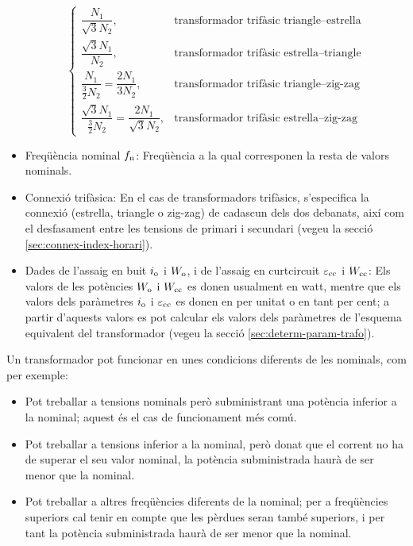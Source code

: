 \begin{itemize}
\begin{equation}
\begin{cases}
        \dfrac{N_1}{\sqrt{3}N_2}, & \text{transformador trifàsic triangle--estrella} \\[0.4cm]
        \dfrac{\sqrt{3}N_1}{N_2}, & \text{transformador trifàsic estrella--triangle} \\[0.4cm]
        \dfrac{N_1}{\frac{3}{2}N_2} = \dfrac{2 N_1}{3 N_2}, & \text{transformador trifàsic triangle--zig-zag} \\[0.4cm]
        \dfrac{\sqrt{3}N_1}{\frac{3}{2}N_2} = \dfrac{2 N_1}{\sqrt{3} N_2}, & \text{transformador trifàsic estrella--zig-zag}
         \end{cases}
       \end{equation}
   \item Freqüència nominal $f_\mathrm{n}$: Freqüència a la qual corresponen la resta de valors nominals.
   \item Connexió trifàsica: En el cas de transformadors trifàsics, s'especifica la connexió (estrella, triangle o zig-zag) de cadascun dels dos debanats, així com el desfasament entre les tensions de primari i secundari (vegeu la secció \vref{sec:connex-index-horari}).
   \item Dades de l'assaig en buit $i_\mathrm{o}$ i $W_\mathrm{o}$, i de l'assaig en curtcircuit $\varepsilon_\mathrm{cc}$ i $W_\mathrm{cc}$: Els valors de les potències $W_\mathrm{o}$ i $W_\mathrm{cc}$ es donen
usualment en watt, mentre que els valors dels paràmetres $i_\mathrm{o}$
i $\varepsilon_\mathrm{cc}$ es donen en per unitat o en tant per cent; a partir d'aquests valors es pot calcular els valors dels paràmetres de l'esquema equivalent del transformador  (vegeu la secció \vref{sec:determ-param-trafo}).
\end{itemize}

Un transformador pot funcionar en unes condicions diferents de les nominals, com per exemple:
\begin{itemize}
   \item Pot treballar a tensions nominals però subministrant una potència inferior a la nominal; aquest és el cas de funcionament més comú.
   \item Pot treballar a tensions inferior a la nominal, però donat que el corrent no ha de superar el seu valor nominal, la potència subministrada haurà de ser menor que la nominal.
   \item Pot treballar a altres freqüències diferents de la nominal; per a freqüències superiors cal tenir en compte que les pèrdues seran també superiors, i per tant la potència subministrada haurà de ser menor que la nominal.
\end{itemize}

